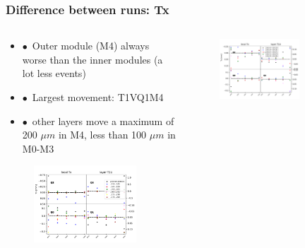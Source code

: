 \documentclass[aspectratio=1610, 12pt]{beamer}
\begin{document}
\begin{frame}\frametitle{Difference between runs: Tx}
  \begin{columns}
    \begin{column}[c]{0.48\textwidth}
      \begin{itemize}
        \item $\bullet$\, Outer module (M4) always worse than the inner modules (a lot less events)
        \item $\bullet$\, Largest movement: T1VQ1M4 
        \item $\bullet$\, other layers move a maximum of 200 $\mu m$ in M4, less than 100 $\mu m$ in M0-M3
      \end{itemize}
      \begin{figure}
        \includegraphics[width=0.9\textwidth]{plots/stability_plots/diff_data_T1U_Tx.pdf}
      \end{figure}
    \end{column}
      \begin{column}[c]{0.48\textwidth}
        \begin{figure}
          \includegraphics[width=0.7\textwidth]{plots/stability_plots/diff_reduced_Tx_T1U_Tx.pdf}

\end{figure}
\end{column}
\end{columns}
\end{frame}
\end{document}
